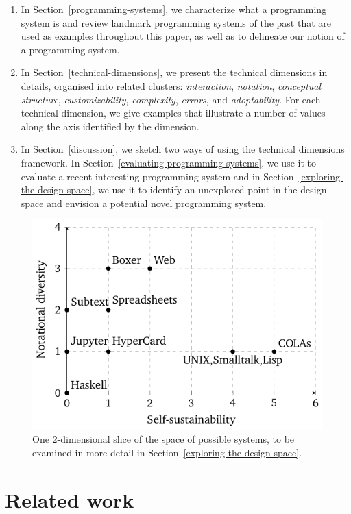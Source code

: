 \begin{enumerate}
\def\labelenumi{\arabic{enumi}.}
\tightlist
\item
  In Section~\ref{programming-systems}, we characterize what a
  programming system is and review landmark programming systems of the
  past that are used as examples throughout this paper, as well as to
  delineate our notion of a programming system.
\item
  In Section~\ref{technical-dimensions}, we present the technical
  dimensions in details, organised into related clusters:
  \emph{interaction}, \emph{notation}, \emph{conceptual structure},
  \emph{customizability}, \emph{complexity}, \emph{errors}, and
  \emph{adoptability}. For each technical dimension, we give examples
  that illustrate a number of values along the axis identified by the
  dimension.
\item
  In Section~\ref{discussion}, we sketch two ways of using the technical
  dimensions framework. In Section~\ref{evaluating-programming-systems},
  we use it to evaluate a recent interesting programming system and in
  Section~\ref{exploring-the-design-space}, we use it to identify an
  unexplored point in the design space and envision a potential novel
  programming system.
\end{enumerate}

\begin{figure}
  \centering
  \includegraphics[width=0.6\linewidth]{plot-figure0.pdf}
  \caption{One 2-dimensional slice of the space of possible systems, to be examined in more detail in Section\ \ref{exploring-the-design-space}.\label{fig:tech-dims-diagram}}
\end{figure}

\hypertarget{related-work}{%
\section{Related work}\label{related-work}}

